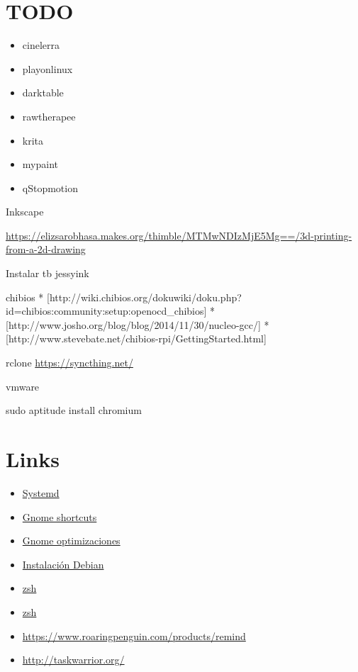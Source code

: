\documentclass[12pt,spanish,]{article}
\providecommand{\tightlist}{%
  \setlength{\itemsep}{0pt}\setlength{\parskip}{0pt}}
\begin{document}
\section{TODO}\label{todo-1}

\begin{itemize}
\tightlist
\item
  cinelerra
\item
  playonlinux
\item
  darktable
\item
  rawtherapee
\item
  krita
\item
  mypaint
\item
  qStopmotion
\end{itemize}

Inkscape

\url{https://elizsarobhasa.makes.org/thimble/MTMwNDIzMjE5Mg==/3d-printing-from-a-2d-drawing}

Instalar tb jessyink

chibios *
{[}http://wiki.chibios.org/dokuwiki/doku.php?id=chibios:community:setup:openocd\_chibios{]}
* {[}http://www.josho.org/blog/blog/2014/11/30/nucleo-gcc/{]} *
{[}http://www.stevebate.net/chibios-rpi/GettingStarted.html{]}

rclone \url{https://syncthing.net/}

vmware

sudo aptitude install chromium

\section{Links}\label{links}

\begin{itemize}
\tightlist
\item
  \href{https://wiki.debian.org/systemd}{Systemd}
\item
  \href{https://wiki.gnome.org/Design/OS/KeyboardShortcuts}{Gnome
  shortcuts}
\item
  \href{https://www.linux.com/learn/easy-steps-make-gnome-3-more-efficient}{Gnome
  optimizaciones}
\item
  \href{https://diversidadyunpocodetodo.blogspot.com.es/2015/03/sensores-temperatura-hardware-discos-cpu-debian-ubuntu.html}{Instalación
  Debian}
\item
  \href{http://joshldavis.com/2014/07/26/oh-my-zsh-is-a-disease-antigen-is-the-vaccine/}{zsh}
\item
  \href{http://blog.namangoel.com/zsh-with-antigen}{zsh}
\item
  \url{https://www.roaringpenguin.com/products/remind}
\item
  \url{http://taskwarrior.org/}
\end{itemize}
\end{document}
